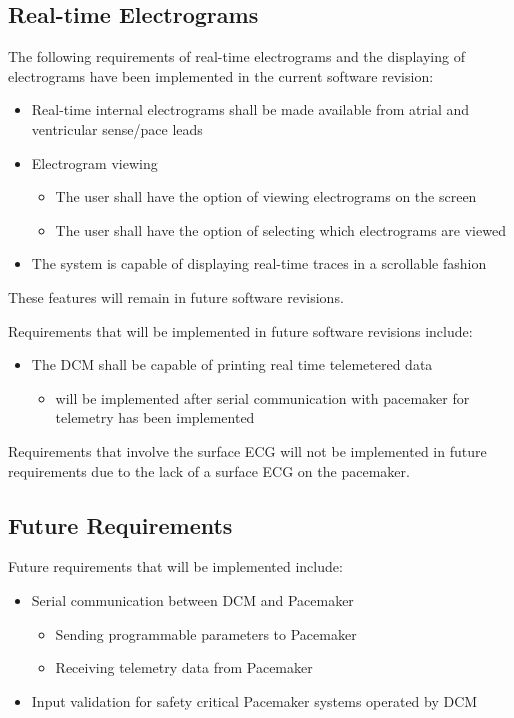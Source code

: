 \documentclass[12pt]{article}
\begin{document}
\subsection{Real-time Electrograms}
The following requirements of real-time electrograms and the displaying of electrograms have been implemented in the current software revision:
\begin{itemize}
    \item Real-time internal electrograms shall be made available from atrial and ventricular sense/pace leads
    \item Electrogram viewing
    \begin{itemize}
        \item The user shall have the option of viewing electrograms on the screen
        \item The user shall have the option of selecting which electrograms are viewed
    \end{itemize}
    \item The system is capable of displaying real-time traces in a scrollable fashion
\end{itemize}
These features will remain in future software revisions.

Requirements that will be implemented in future software revisions include:
\begin{itemize}
    \item The DCM shall be capable of printing real time telemetered data
    \begin{itemize}
        \item will be implemented after serial communication with pacemaker for telemetry has been implemented
    \end{itemize}
\end{itemize}

Requirements that involve the surface ECG will not be implemented in future requirements due to the lack of a surface ECG on the pacemaker.

\subsection{Future Requirements}
Future requirements that will be implemented include:
\begin{itemize}
    \item Serial communication between DCM and Pacemaker
    \begin{itemize}
        \item Sending programmable parameters to Pacemaker
        \item Receiving telemetry data from Pacemaker
    \end{itemize}
    \item Input validation for safety critical Pacemaker systems operated by DCM
\end{itemize}
\end{document}
